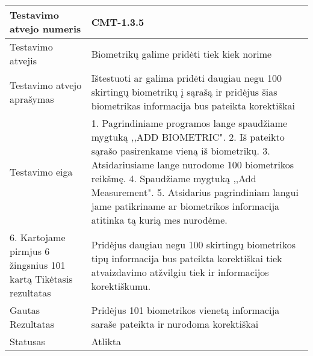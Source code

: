 \documentclass[oneside]{VUMIFPSkursinis}
\begin{document}
\begin{center}
    \begin{tabular}{ |p{5cm}|p{13cm}|}
    \hline
        Testavimo atvejo numeris & CMT-1.3.5  \\ \hline
        Testavimo atvejis & Biometrikų galime pridėti tiek kiek norime  \\ \hline
        Testavimo atvejo aprašymas & Ištestuoti ar galima pridėti daugiau negu 100 skirtingų biometrikų į sąrašą ir pridėjus šias biometrikas informacija bus pateikta korektiškai \\ \hline
        Testavimo eiga &  1. Pagrindiniame programos lange spaudžiame mygtuką ,,ADD BIOMETRIC". 
				2. Iš pateikto sąrašo pasirenkame vieną iš biometrikų. 
				3. Atsidariusiame lange nurodome 100 biometrikos reikšmę.
				4. Spaudžiame mygtuką ,,Add Measurement".
				5. Atsidarius pagrindiniam langui jame patikriname ar biometrikos informacija atitinka tą kurią mes nurodėme.\\ \hline
				6. Kartojame pirmjus 6 žingsnius 101 kartą
        Tikėtasis rezultatas & Pridėjus daugiau negu 100 skirtingų biometrikos tipų informacija bus pateikta korektiškai tiek atvaizdavimo atžvilgiu tiek ir informacijos korektiškumu.\\ \hline
        Gautas Rezultatas & Pridėjus 101 biometrikos vienetą informacija saraše pateikta ir nurodoma korektiškai  \\ \hline
        Statusas & Atlikta  \\ \hline
    \hline
    \end{tabular}
\end{center}
\end{document}
